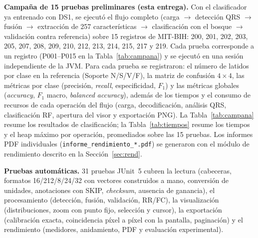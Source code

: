 \textbf{Campaña de 15 pruebas preliminares (esta entrega).} Con el
clasificador ya entrenado con DS1, se ejecutó el flujo completo
(carga $\rightarrow$ detección QRS $\rightarrow$ fusión $\rightarrow$
extracción de 257 características $\rightarrow$ clasificación con el
bosque $\rightarrow$ validación contra referencia) sobre 15 registros
de MIT-BIH: 200, 201, 202, 203, 205, 207, 208, 209, 210, 212, 213, 214,
215, 217 y 219. Cada prueba corresponde a un registro (P001--P015 en la
Tabla~\ref{tab:campana}) y se ejecutó en una sesión independiente de la
JVM. Para cada prueba se registraron: el número de latidos por clase en
la referencia (Soporte N/S/V/F), la matriz de confusión $4\times4$, las
métricas por clase (precisión, \emph{recall}, especificidad, $F_1$) y
las métricas globales (\emph{accuracy}, $F_1$ macro, \emph{balanced
accuracy}), además de los tiempos y el consumo de recursos de cada
operación del flujo (carga, decodificación, análisis QRS, clasificación
RF, apertura del visor y exportación PNG). La Tabla~\ref{tab:campana}
resume los resultados de clasificación; la Tabla~\ref{tab:tiempos}
resume los tiempos y el heap máximo por operación, promediados sobre las
15 pruebas. Los informes PDF individuales
(\texttt{informe\_rendimiento\_*.pdf}) se generaron con el módulo de
rendimiento descrito en la Sección~\ref{sec:rend}.


\textbf{Pruebas automáticas.} 31 pruebas JUnit~5 cubren la lectura
(cabeceras, formatos 16/212/8/24/32 con vectores construidos a mano,
conversión de unidades, anotaciones con SKIP, \emph{checksum}, ausencia
de ganancia), el procesamiento (detección, fusión, validación, RR/FC),
la visualización (distribuciones, zoom con punto fijo, selección y
cursor), la exportación (calibración exacta, coincidencia píxel a píxel
con la pantalla, paginación) y el rendimiento (medidores, anidamiento,
PDF y evaluación experimental).
